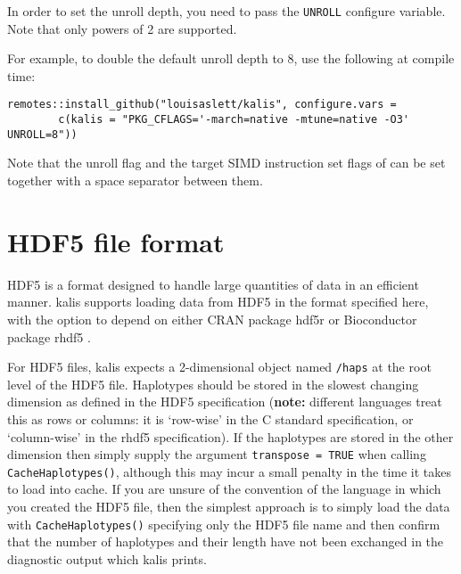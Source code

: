 \documentclass[a4paper]{article}
\let\proglang=\textsf
\newcommand{\pkg}[1]{{\fontseries{m}\fontseries{b}\selectfont #1}}
\begin{document}
In order to set the unroll depth, you need to pass the \texttt{UNROLL} configure variable.
Note that only powers of 2 are supported.

For example, to double the default unroll depth to 8, use the following at compile time:

\begin{verbatim}
remotes::install_github("louisaslett/kalis", configure.vars =
        c(kalis = "PKG_CFLAGS='-march=native -mtune=native -O3' UNROLL=8"))
\end{verbatim}

%

Note that the unroll flag and the target SIMD instruction set flags of  can be set together with a space separator between them.



\section{HDF5 file format}
\label{apx:hdf5}

HDF5 \cite{hdf5} is a format designed to handle large quantities of data in an efficient manner.
\pkg{kalis} supports loading data from HDF5 in the format specified here, with the option to depend on either CRAN package \pkg{hdf5r} \cite{hdf5r} or Bioconductor \cite{bioc} package \pkg{rhdf5} \cite{rhdf5}.

For HDF5 files, \pkg{kalis} expects a 2-dimensional object named \texttt{/haps} at the root level of the HDF5 file.
Haplotypes should be stored in the slowest changing dimension as defined in the HDF5 specification (\textbf{note:} different languages treat this as rows or columns: it is `row-wise' in the \proglang{C} standard specification, or `column-wise' in the \pkg{rhdf5} specification).
If the haplotypes are stored in the other dimension then simply supply the argument \texttt{transpose\ =\ TRUE} when calling \texttt{CacheHaplotypes()}, although this may incur a small penalty in the time it takes to load into cache.
If you are unsure of the convention of the language in which you created the HDF5 file, then the simplest approach is to simply load the data with \texttt{CacheHaplotypes()} specifying only the HDF5 file name and then confirm that the number of haplotypes and their length have not been exchanged in the diagnostic output which \pkg{kalis} prints.
\end{document}
